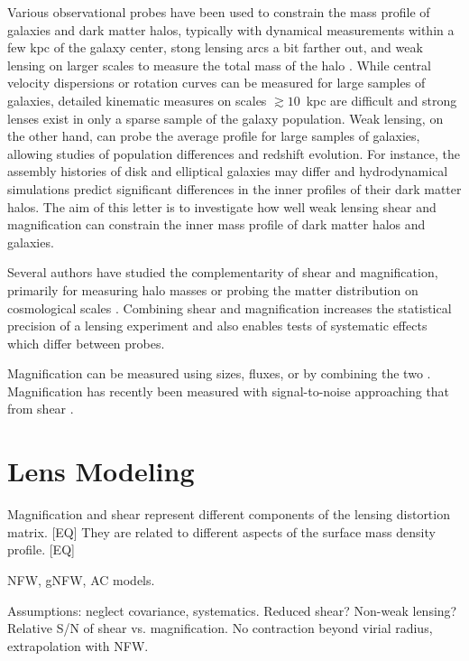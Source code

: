 \documentclass[12pt]{emulateapj}
\begin{document}
Various observational probes have been used to constrain the mass
profile of galaxies and dark matter halos, typically with dynamical
measurements within a few kpc of the galaxy center, stong lensing arcs
a bit farther out, and weak lensing on larger scales to measure the
total mass of the halo \citep[e.g.,][]{Sand2004, Koopmans2006, Gavazzi2007,
  Auger2010, Schulz2010, Newman2013a}.
While central velocity dispersions or rotation curves can be measured
for large samples of galaxies, detailed kinematic measures on scales
$\gtrsim10$~kpc are difficult and strong lenses exist in only a sparse
sample of the galaxy population. Weak lensing, on the other hand, can
probe the average profile for large samples of galaxies, allowing
studies of population differences and redshift evolution. For
instance, the assembly histories of disk and elliptical galaxies may
differ and hydrodynamical simulations predict significant differences
in the inner profiles of their dark matter halos. 
The aim of this letter is to investigate how well weak lensing shear
and magnification can constrain the inner mass profile of dark matter
halos and galaxies.

Several authors have studied the complementarity of shear and
magnification, primarily for measuring halo masses
\citep{Bartelmann1996, Bridle1998, Schneider2000, vanWaerbeke2010b,
  Rozo2010, Umetsu2011} or probing the matter distribution on
cosmological scales \citep{vanWaerbeke2010a, Casaponsa2013,
  Duncan2013, Krause2013}. Combining shear and magnification increases
the statistical precision of a lensing experiment and also enables
tests of systematic effects which differ between probes.

Magnification can be measured using sizes, fluxes, or by combining the
two \citep{}. Magnification has recently been measured with
signal-to-noise approaching that from shear \citep{Scranton2005, Hildebrandt2009,
  Menard2010, Huff2011, Ford2012, Schmidt2012}.

\section{Lens Modeling}

Magnification and shear represent different components of the
lensing distortion matrix. [EQ] They are related to different aspects of
the surface mass density profile. [EQ]

NFW, gNFW, AC models.

Assumptions: neglect covariance, systematics. Reduced shear? Non-weak
lensing? Relative S/N of shear vs. magnification. No contraction
beyond virial radius, extrapolation with NFW.
\end{document}
